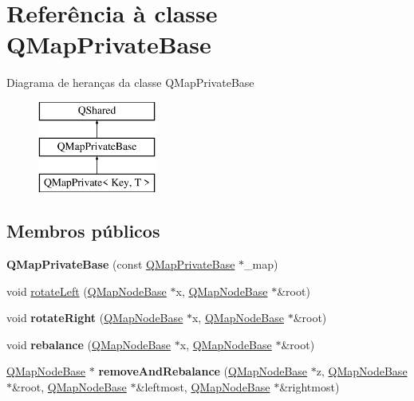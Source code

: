 \hypertarget{class_q_map_private_base}{\section{Referência à classe Q\-Map\-Private\-Base}
\label{class_q_map_private_base}
}
Diagrama de heranças da classe Q\-Map\-Private\-Base\begin{figure}[H]
\begin{center}
\leavevmode
\includegraphics[height=3.000000cm]{class_q_map_private_base}
\end{center}
\end{figure}
\subsection*{Membros públicos}
\begin{DoxyCompactItemize}
\item 
\hypertarget{class_q_map_private_base_a357b8937971bb81eb3b73c59e3ed6e1c}{{\bfseries Q\-Map\-Private\-Base} (const \hyperlink{class_q_map_private_base}{Q\-Map\-Private\-Base} $\ast$\-\_\-map)}\label{class_q_map_private_base_a357b8937971bb81eb3b73c59e3ed6e1c}

\item 
void \hyperlink{class_q_map_private_base_af160a97d7feac877f245433b19596a63}{rotate\-Left} (\hyperlink{struct_q_map_node_base}{Q\-Map\-Node\-Base} $\ast$x, \hyperlink{struct_q_map_node_base}{Q\-Map\-Node\-Base} $\ast$\&root)
\item 
\hypertarget{class_q_map_private_base_abbb8b43bd362fe616a7002b62dc5429f}{void {\bfseries rotate\-Right} (\hyperlink{struct_q_map_node_base}{Q\-Map\-Node\-Base} $\ast$x, \hyperlink{struct_q_map_node_base}{Q\-Map\-Node\-Base} $\ast$\&root)}\label{class_q_map_private_base_abbb8b43bd362fe616a7002b62dc5429f}

\item 
\hypertarget{class_q_map_private_base_a5227e6a73a11b27086b94f3ff58d0204}{void {\bfseries rebalance} (\hyperlink{struct_q_map_node_base}{Q\-Map\-Node\-Base} $\ast$x, \hyperlink{struct_q_map_node_base}{Q\-Map\-Node\-Base} $\ast$\&root)}\label{class_q_map_private_base_a5227e6a73a11b27086b94f3ff58d0204}

\item 
\hypertarget{class_q_map_private_base_a15bc0280483c304df62e46a336c7f229}{\hyperlink{struct_q_map_node_base}{Q\-Map\-Node\-Base} $\ast$ {\bfseries remove\-And\-Rebalance} (\hyperlink{struct_q_map_node_base}{Q\-Map\-Node\-Base} $\ast$z, \hyperlink{struct_q_map_node_base}{Q\-Map\-Node\-Base} $\ast$\&root, \hyperlink{struct_q_map_node_base}{Q\-Map\-Node\-Base} $\ast$\&leftmost, \hyperlink{struct_q_map_node_base}{Q\-Map\-Node\-Base} $\ast$\&rightmost)}\label{class_q_map_private_base_a15bc0280483c304df62e46a336c7f229}

\end{DoxyCompactItemize}
